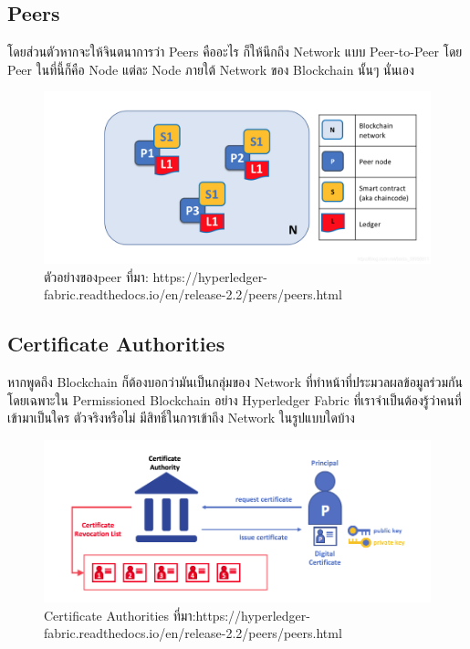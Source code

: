 \subsection{Peers}
\cite{Hyperledger_a} 
 โดยส่วนตัวหากจะให้จินตนาการว่า Peers คืออะไร ก็ให้นึกถึง Network แบบ Peer-to-Peer โดย Peer ในที่นี้ก็คือ Node แต่ละ Node ภายใต้ Network ของ Blockchain นั้นๆ นั่นเอง
 \graphicspath{ {./images/} }
 \begin{figure}[htbp]
   \centering 
   \includegraphics[scale=0.2]{peer.png}
   \caption[Peer]{ตัวอย่างของpeer
   ที่มา: https://hyperledger-fabric.readthedocs.io/en/release-2.2/peers/peers.html}
   \label{fig:Peer}
 \end{figure}



\subsection{Certificate Authorities}
\cite{Hyperledger_a} 
หากพูดถึง Blockchain ก็ต้องบอกว่ามันเป็นกลุ่มของ Network ที่ทำหน้าที่ประมวลผลข้อมูลร่วมกัน โดยเฉพาะใน Permissioned Blockchain อย่าง Hyperledger Fabric ที่เราจำเป็นต้องรู้ว่าคนที่เข้ามาเป็นใคร ตัวจริงหรือไม่ มีสิทธิ์ในการเข้าถึง Network ในรูปแบบใดบ้าง
\graphicspath{ {./images/} }
\begin{figure}[htbp]
  \centering 
  \includegraphics[scale=0.5]{certifi.png}
  \caption[Certificate Authorities]{Certificate Authorities
  ที่มา:https://hyperledger-fabric.readthedocs.io/en/release-2.2/peers/peers.html}
  \label{fig:Certificate}
\end{figure}

